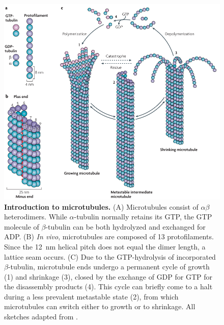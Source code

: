 \begin{figure}[h!tb]
\centering
\includegraphics[width=\linewidth]{Figures/MTintro.png}
\caption[Introduction to microtubules.]{\textbf{Introduction to microtubules.}
(A) Microtubules consist of $\alpha\beta$ heterodimers. While $\alpha$-tubulin normally retains its GTP, the GTP molecule of $\beta$-tubulin can be both hydrolyzed and exchanged for ADP. (B) \textit{In vivo}, microtubules are composed of 13 protofilaments. Since the \SI{12}{\nm} helical pitch does not equal the dimer length, a lattice seam occurs. (C) Due to the GTP-hydrolysis of incorporated $\beta$-tubulin, microtubule ends undergo a permanent cycle of growth (1) and shrinkage (3), closed by the exchange of GDP for GTP for the disassembly products (4). This cycle can briefly come to a halt during a less prevalent metastable state (2), from which microtubules can switch either to growth or to shrinkage. All sketches adapted from \cite{Akhmanova2008}.
	}\label{MTintro}
\end{figure}

\FloatBarrier

